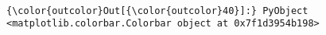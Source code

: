 \documentclass[11pt]{article}
\begin{document}
    \begin{center}
    \end{center}
    { \hspace*{\fill} \\}
    
\begin{Verbatim}[commandchars=\\\{\}]
{\color{outcolor}Out[{\color{outcolor}40}]:} PyObject <matplotlib.colorbar.Colorbar object at 0x7f1d3954b198>
\end{Verbatim}
            

    
    
    
    
\end{document}
